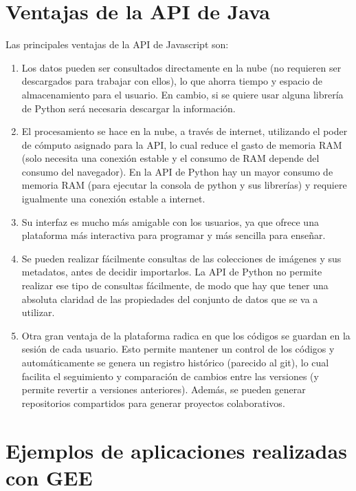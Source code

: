 \documentclass[
  12pt,
  letterpaper,
  twoside]{book}
\providecommand{\tightlist}{%
  \setlength{\itemsep}{0pt}\setlength{\parskip}{0pt}}
\begin{document}
\hypertarget{ventajas-de-la-api-de-java}{%
\section{Ventajas de la API de Java}\label{ventajas-de-la-api-de-java}}

Las principales ventajas de la API de Javascript son:

\begin{enumerate}
\def\labelenumi{\arabic{enumi}.}
\tightlist
\item
  Los datos pueden ser consultados directamente en la nube (no requieren ser descargados para trabajar con ellos), lo que ahorra tiempo y espacio de almacenamiento para el usuario. En cambio, si se quiere usar alguna librería de Python será necesaria descargar la información.
\item
  El procesamiento se hace en la nube, a través de internet, utilizando el poder de cómputo asignado para la API, lo cual reduce el gasto de memoria RAM (solo necesita una conexión estable y el consumo de RAM depende del consumo del navegador). En la API de Python hay un mayor consumo de memoria RAM (para ejecutar la consola de python y sus librerías) y requiere igualmente una conexión estable a internet.
\item
  Su interfaz es mucho más amigable con los usuarios, ya que ofrece una plataforma más interactiva para programar y más sencilla para enseñar.
\item
  Se pueden realizar fácilmente consultas de las colecciones de imágenes y sus metadatos, antes de decidir importarlos. La API de Python no permite realizar ese tipo de consultas fácilmente, de modo que hay que tener una absoluta claridad de las propiedades del conjunto de datos que se va a utilizar.
\item
  Otra gran ventaja de la plataforma radica en que los códigos se guardan en la sesión de cada usuario. Esto permite mantener un control de los códigos y automáticamente se genera un registro histórico (parecido al git), lo cual facilita el seguimiento y comparación de cambios entre las versiones (y permite revertir a versiones anteriores). Además, se pueden generar repositorios compartidos para generar proyectos colaborativos.
\end{enumerate}

\hypertarget{ejemplos-de-aplicaciones-realizadas-con-gee}{%
\section{Ejemplos de aplicaciones realizadas con GEE}\label{ejemplos-de-aplicaciones-realizadas-con-gee}}
\end{document}
